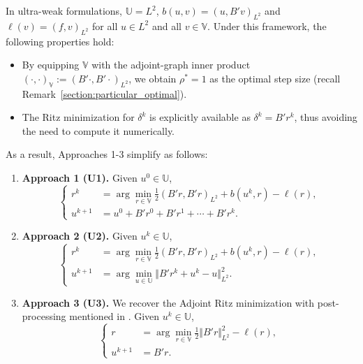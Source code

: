 \documentclass{article}
\theoremstyle{definition}
\begin{document}
In ultra-weak formulations, $\mathbb{U}=L^2$, $b(u,v)=(u,B'v)_{L^2}$ and $\ell(v)=(f,v)_{L^2}$ for all $u\in L^2$ and all $v\in \mathbb{V}$. Under this framework, the following properties hold:
\begin{itemize}
    \item By equipping $\mathbb{V}$ with the adjoint-graph inner product $(\cdot,\cdot)_{\mathbb{V}} := (B'\cdot,B'\cdot)_{L^2}$, we obtain $\rho^*=1$ as the optimal step size (recall Remark~\ref{section:particular_optimal}).
    \item The Ritz minimization for $\delta^k$ is explicitly available as $\delta^k=B'r^k$, thus avoiding the need to compute it numerically.
\end{itemize} 
As a result, Approaches 1-3 simplify as follows:
    \begin{enumerate}
        \item[] \textbf{Approach 1 (U1).} Given $u^0\in\mathbb U$,\begin{equation}
    \left\{
    \begin{aligned}
        r^{k} &=  \displaystyle\arg\min_{r\in \mathbb{V}}\frac{1}{2} (B'r,B'r)_{L^2} + b(u^k,r)-\ell(r),\\[2ex]
        u^{k+1} &= u^0 + B'r^0 + B'r^1 + \cdots + B'r^k.
\end{aligned}
    \right.
    \label{eq:UzawaUltraweak_ap1}
\end{equation}
        \item[] \textbf{Approach 2 (U2).} Given $u^k\in\mathbb U$,\begin{equation}
    \left\{
    \begin{aligned}
        r^{k} &=  \displaystyle\arg\min_{r\in \mathbb{V}}\frac{1}{2}(B'r,B'r)_{L^2} + b(u^k,r)-\ell(r),\\[2ex]
        u^{k+1} &= \displaystyle\arg\min_{u\in\mathbb{U}} \Vert B'r^k+ u^k - u\Vert_{L^2}^2.
\end{aligned}
    \right.
    \label{eq:Uzawa_continuous5}
\end{equation}
         \item [] \textbf{Approach 3 (U3).} We recover the Adjoint Ritz minimization with post-processing mentioned in \cite{uriarte2023DoubleRitz}.
Given $u^{k}\in\mathbb U$, \begin{equation}
        \left\{
    \begin{aligned}
        r &=  \arg\min_{r\in \mathbb{V}} \frac{1}{2} \Vert B'r\Vert_{L^2}^2 - \ell(r),\\[2ex]
        u^{k+1} &= B'r.
\end{aligned}
    \right.
\end{equation}
\end{enumerate}
\end{document}
